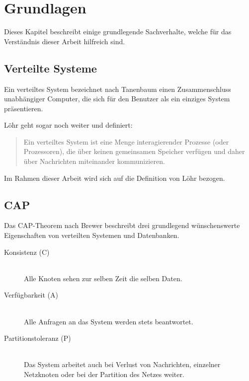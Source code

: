 \chapter{Grundlagen}
\label{chap:base}
Dieses Kapitel beschreibt einige grundlegende Sachverhalte,
welche für das Verständnis dieser Arbeit hilfreich sind.

\section{Verteilte Systeme}
\label{sec:base:vs}

Ein verteiltes System bezeichnet nach Tanenbaum \cite{tanenbaum:vs}
einen Zusammenschluss unabhängiger Computer, die sich für den Benutzer als ein einziges System präsentieren.

L\"ohr geht sogar noch weiter und definiert:
\begin{quotation}
    Ein verteiltes System ist eine Menge
    interagierender Prozesse (oder Prozessoren),
    die über keinen gemeinsamen Speicher verfügen
    und daher über Nachrichten miteinander kommunizieren. \cite{loehr:vs}
\end{quotation}

Im Rahmen dieser Arbeit wird sich auf die Definition von L\"ohr bezogen.

\section{CAP}
\label{sec:base:cap}
Das \ac{CAP}-Theorem nach Brewer \cite{brewer:cap} beschreibt drei grundlegend
wünschenswerte Eigenschaften von verteilten Systemen und Datenbanken.

\begin{description}
  \item[Konsistenz (C)] \hfill \\
      Alle Knoten sehen zur selben Zeit die selben Daten. 
  \item[Verfügbarkeit (A)] \hfill \\
      Alle Anfragen an das System werden stets beantwortet.
  \item[Partitionstoleranz (P)] \hfill \\
      Das System arbeitet auch bei Verlust von Nachrichten,
      einzelner Netzknoten oder bei der Partition des Netzes weiter.
\end{description}

